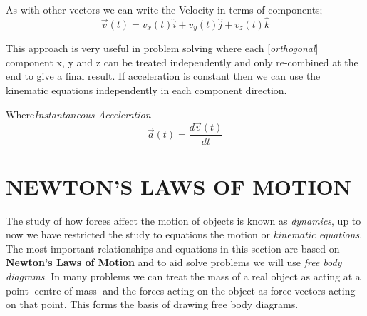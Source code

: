 \documentclass[12pt, letterpaper, twoside]{article}
\begin{document}
\bigskip
As with other vectors we can write the Velocity in terms of components;
\begin{equation}
\overrightarrow{v}(t) = v_x(t) \hat{i} + v_y(t) \hat{j} + v_z(t) \hat{k}
\end{equation}


This approach is very useful in problem solving where each [\textit{orthogonal}] component x, y and z can be treated independently and only re-combined at the end to give a final result.  If acceleration is constant then we can use the kinematic equations independently in each component direction. 

\bigskip

Where\emph{Instantaneous Acceleration}
\begin{equation}
\overrightarrow{a}(t)= \frac{d \overrightarrow{v}(t)}{dt}
\end{equation}







\newpage

\section{NEWTON'S LAWS OF MOTION}

The study of how forces affect the motion of objects is known as \emph{dynamics}, up to now we have restricted the study to equations the motion or \emph{kinematic equations}.  The most important relationships and equations in this section are based on \textbf{Newton's Laws of Motion} and to aid solve problems we will use \emph{free body diagrams}. 
\bigskip
In many problems we can treat the mass of a real object as acting at a point [centre of mass] and the forces acting on the object as force vectors acting on that point.  This forms the basis of drawing free body diagrams.
\bigskip



\end{document}
